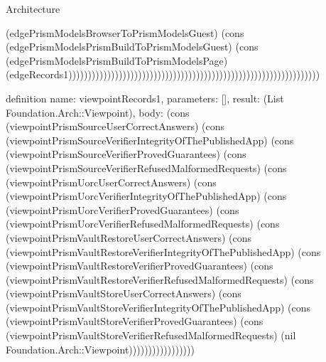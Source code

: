 \begin{lexlean}{Architecture}
\begin{semanticmodule}
{(edgePrismModelsBrowserToPrismModelsGuest) (cons (edgePrismModelsPrismBuildToPrismModelsGuest) (cons (edgePrismModelsPrismBuildToPrismModelsPage) (edgeRecords1)))))))))))))))))))))))))))))))))))))))))))))))))))))))))))))))))
}

definition{
  name: viewpointRecords1,
  parameters: [],
  result: (List Foundation.Arch::Viewpoint),
  body: (cons (viewpointPrismSourceUserCorrectAnswers) (cons (viewpointPrismSourceVerifierIntegrityOfThePublishedApp) (cons (viewpointPrismSourceVerifierProvedGuarantees) (cons (viewpointPrismSourceVerifierRefusedMalformedRequests) (cons (viewpointPrismUorcUserCorrectAnswers) (cons (viewpointPrismUorcVerifierIntegrityOfThePublishedApp) (cons (viewpointPrismUorcVerifierProvedGuarantees) (cons (viewpointPrismUorcVerifierRefusedMalformedRequests) (cons (viewpointPrismVaultRestoreUserCorrectAnswers) (cons (viewpointPrismVaultRestoreVerifierIntegrityOfThePublishedApp) (cons (viewpointPrismVaultRestoreVerifierProvedGuarantees) (cons (viewpointPrismVaultRestoreVerifierRefusedMalformedRequests) (cons (viewpointPrismVaultStoreUserCorrectAnswers) (cons (viewpointPrismVaultStoreVerifierIntegrityOfThePublishedApp) (cons (viewpointPrismVaultStoreVerifierProvedGuarantees) (cons (viewpointPrismVaultStoreVerifierRefusedMalformedRequests) (nil Foundation.Arch::Viewpoint)))))))))))))))))
}


\end{semanticmodule}
\end{lexlean}
